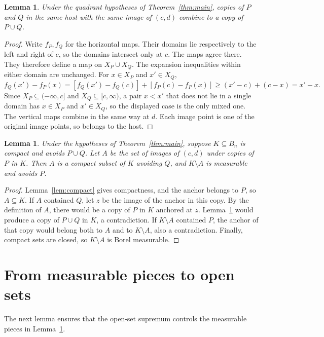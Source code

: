 \documentclass[11pt]{article}
\newtheorem{lemma}[theorem]{Lemma}
\begin{document}
\begin{lemma}\label{lem:glue}
Under the quadrant hypotheses of Theorem~\ref{thm:main}, copies of $P$ and $Q$ in the same host with the same image of $(c,d)$ combine to a copy of $P\cup Q$.
\end{lemma}
\begin{proof}
Write $f_P,f_Q$ for the horizontal maps. Their domains lie respectively to the left and right of $c$, so the domains intersect only at $c$. The maps agree there. They therefore define a map on $X_P\cup X_Q$. The expansion inequalities within either domain are unchanged. For $x\in X_P$ and $x'\in X_Q$,
\[
 f_Q(x')-f_P(x)
 =[f_Q(x')-f_Q(c)]+[f_P(c)-f_P(x)]
 \ge (x'-c)+(c-x)=x'-x.
\]
Since $X_P\subseteq(-\infty,c]$ and $X_Q\subseteq[c,\infty)$, a pair $x<x'$ that does not lie in a single domain has $x\in X_P$ and $x'\in X_Q$, so the displayed case is the only mixed one. The vertical maps combine in the same way at $d$. Each image point is one of the original image points, so belongs to the host.
\end{proof}

\begin{lemma}\label{lem:partition}
Under the hypotheses of Theorem~\ref{thm:main}, suppose $K\subseteq B_n$ is compact and avoids $P\cup Q$. Let $A$ be the set of images of $(c,d)$ under copies of $P$ in $K$. Then $A$ is a compact subset of $K$ avoiding $Q$, and $K\setminus A$ is measurable and avoids $P$.
\end{lemma}
\begin{proof}
Lemma~\ref{lem:compact} gives compactness, and the anchor belongs to $P$, so $A\subseteq K$. If $A$ contained $Q$, let $z$ be the image of the anchor in this copy. By the definition of $A$, there would be a copy of $P$ in $K$ anchored at $z$. Lemma~\ref{lem:glue} would produce a copy of $P\cup Q$ in $K$, a contradiction. If $K\setminus A$ contained $P$, the anchor of that copy would belong both to $A$ and to $K\setminus A$, also a contradiction. Finally, compact sets are closed, so $K\setminus A$ is Borel measurable.
\end{proof}

\section{From measurable pieces to open sets}
The next lemma ensures that the open-set supremum controls the measurable pieces in Lemma~\ref{lem:partition}.
\end{document}
